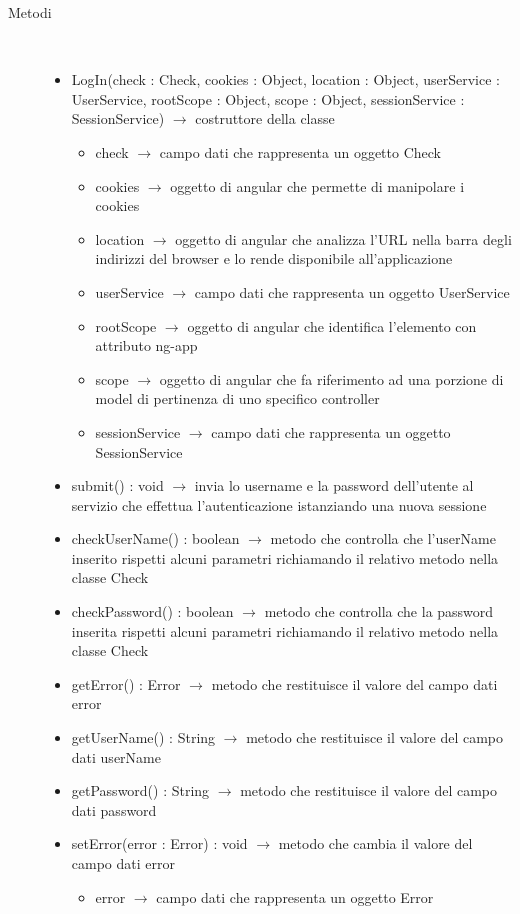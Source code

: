 \begin{description}
\item[Metodi] \hfill \\
\vspace{-7mm}
\begin{itemize}
	\item LogIn(check : Check, cookies : Object, location : Object, userService : UserService, rootScope : Object, scope : Object, sessionService : SessionService) $\rightarrow$ costruttore della classe\begin{itemize}
		\item check $\rightarrow$ campo dati che rappresenta un oggetto Check
		\item cookies $\rightarrow$ oggetto di angular che permette di manipolare i cookies
		\item location $\rightarrow$ oggetto di angular che analizza l'URL nella barra degli indirizzi del browser e lo rende disponibile all'applicazione
		\item userService $\rightarrow$ campo dati che rappresenta un oggetto UserService
		\item rootScope $\rightarrow$ oggetto di angular che identifica l’elemento con attributo ng-app
		\item scope $\rightarrow$ oggetto di angular che fa riferimento ad una porzione di model di pertinenza di uno specifico controller
		\item sessionService $\rightarrow$ campo dati che rappresenta un oggetto SessionService
	\end{itemize}
	
	\item submit() : void $\rightarrow$ invia lo username e la password dell'utente al servizio che effettua l'autenticazione istanziando una nuova sessione
	\item checkUserName() : boolean $\rightarrow$ metodo che controlla che l'userName inserito rispetti alcuni parametri richiamando il relativo metodo nella classe Check
	\item checkPassword() : boolean $\rightarrow$ metodo che controlla che la password inserita rispetti alcuni parametri richiamando il relativo metodo nella classe Check
	\item getError() : Error $\rightarrow$ metodo che restituisce il valore del campo dati error
	\item getUserName() : String $\rightarrow$ metodo che restituisce il valore del campo dati userName
	\item getPassword() : String $\rightarrow$ metodo che restituisce il valore del campo dati password
	\item setError(error : Error) : void $\rightarrow$ metodo che cambia il valore del campo dati error\begin{itemize}
		\item error $\rightarrow$ campo dati che rappresenta un oggetto Error
	\end{itemize}
	

\end{itemize}
\end{description}
